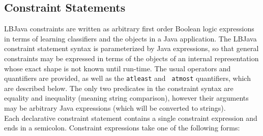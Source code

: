 \subsection{Constraint Statements} \label{subsection:constraintStatements}

LBJava constraints are written as arbitrary first order Boolean logic expressions
in terms of learning classifiers and the objects in a Java application.  The
LBJava constraint statement syntax is parameterized by Java expressions, so that
general constraints may be expressed in terms of the objects of an internal
representation whose exact shape is not known until run-time.  The usual
operators and quantifiers are provided, as well as the {\tt atleast} and {\tt
atmost} quantifiers, which are described below.  The only two predicates in
the constraint syntax are equality and inequality (meaning string comparison),
however their arguments may be arbitrary Java expressions (which will be
converted to strings). \\

Each declarative constraint statement contains a single constraint expression
and ends in a semicolon.  Constraint expressions take one of the following
forms:


